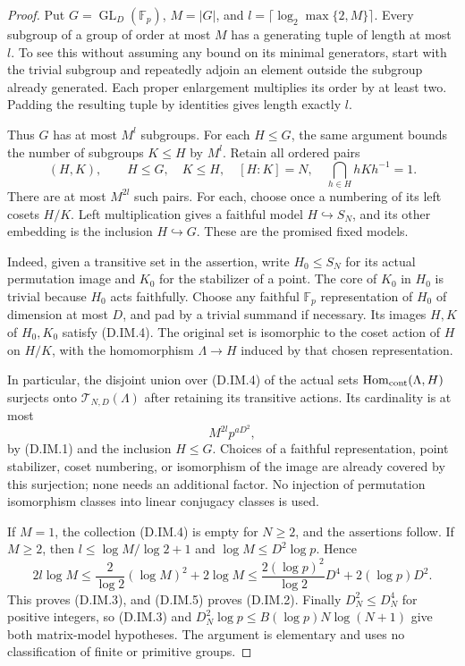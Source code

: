 \begin{proof}
Put $G=\operatorname{GL}_D(\mathbb F_p)$, $M=|G|$, and
$l=\lceil\log_2\max\{2,M\}\rceil$. Every subgroup
of a group of order at most $M$ has a generating tuple
of length at most $l$. To see this without assuming
any bound on its minimal generators, start with the
trivial subgroup and repeatedly adjoin an element
outside the subgroup already generated. Each proper
enlargement multiplies its order by at least two.
Padding the resulting tuple by identities gives
length exactly $l$.

Thus $G$ has at most $M^l$ subgroups. For each
$H\le G$, the same argument bounds the number of
subgroups $K\le H$ by $M^l$. Retain all ordered
pairs
\[
        (H,K),\qquad H\le G,\quad K\le H,\quad
        [H:K]=N,\quad \bigcap_{h\in H}hKh^{-1}=1.
                                                        \tag{D.IM.4}
\]
There are at most $M^{2l}$ such pairs. For each,
choose once a numbering of its left cosets $H/K$.
Left multiplication gives a faithful model
$H\hookrightarrow S_N$, and its other embedding
is the inclusion $H\hookrightarrow G$. These are
the promised fixed models.

Indeed, given a transitive set in the assertion,
write $H_0\le S_N$ for its actual permutation
image and $K_0$ for the stabilizer of a point.
The core of $K_0$ in $H_0$ is trivial because
$H_0$ acts faithfully. Choose any faithful
$\mathbb F_p$ representation of $H_0$ of
dimension at most $D$, and pad by a trivial
summand if necessary. Its images $H,K$ of
$H_0,K_0$ satisfy (D.IM.4). The original set
is isomorphic to the coset action of $H$ on
$H/K$, with the homomorphism $\Lambda\to H$
induced by that chosen representation.

In particular, the disjoint union over (D.IM.4)
of the actual sets
$\operatorname{Hom}_{\rm cont}(\Lambda,H)$
surjects onto $\mathcal T_{N,D}(\Lambda)$
after retaining its transitive actions. Its
cardinality is at most
\[
                  M^{2l}p^{aD^2},                       \tag{D.IM.5}
\]
by (D.IM.1) and the inclusion $H\le G$.
Choices of a faithful representation, point
stabilizer, coset numbering, or isomorphism
of the image are already covered by this
surjection; none needs an additional factor.
No injection of permutation isomorphism
classes into linear conjugacy classes is used.

If $M=1$, the collection (D.IM.4) is empty
for $N\ge2$, and the assertions follow.
If $M\ge2$, then $l\le\log M/\log2+1$
and $\log M\le D^2\log p$. Hence
\[
       2l\log M
       \le \frac{2}{\log2}(\log M)^2+2\log M
       \le \frac{2(\log p)^2}{\log2}D^4
                                      +2(\log p)D^2.    \tag{D.IM.6}
\]
This proves (D.IM.3), and (D.IM.5) proves
(D.IM.2). Finally $D_N^2\le D_N^4$ for
positive integers, so (D.IM.3) and
$D_N^2\log p\le B(\log p)N\log(N+1)$
give both matrix-model hypotheses.
The argument is elementary and uses no
classification of finite or primitive groups.
\end{proof}

